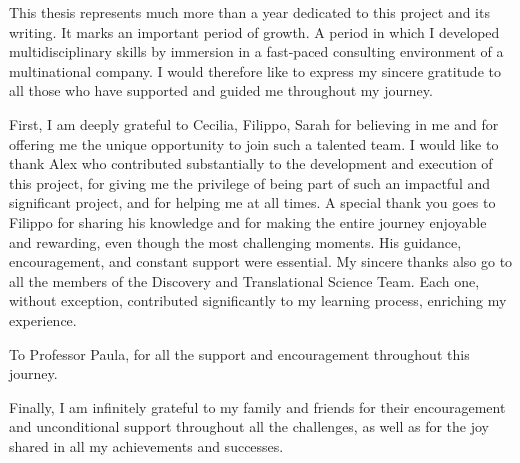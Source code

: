 ﻿%

%

\begin{ntacknowledgements}

This thesis represents much more than a year dedicated to this project and its writing.
It marks an important period of growth. A period in which I developed multidisciplinary skills by immersion in a fast-paced consulting environment of a multinational company.
I would therefore like to express my sincere gratitude to all those who have supported and guided me throughout my journey. 

First, I am deeply grateful to Cecilia, Filippo, Sarah for believing in me and for offering me the unique opportunity to join such a talented team. 
I would like to thank Alex who contributed substantially to the development and execution of this project, for giving me the privilege of being part of such an impactful and significant project, and for helping me at all times.
A special thank you goes to Filippo for sharing his knowledge and for making the entire journey enjoyable and rewarding, even though the most challenging moments.
His guidance, encouragement, and constant support were essential.
My sincere thanks also go to all the members of the Discovery and Translational Science Team. Each one, without exception, contributed significantly to my learning process, enriching my experience.

To Professor Paula, for all the support and encouragement throughout this journey.

Finally, I am infinitely grateful to my family and friends for their encouragement and unconditional support throughout all the challenges, as well as for the joy shared in all my achievements and successes.

\end{ntacknowledgements}
